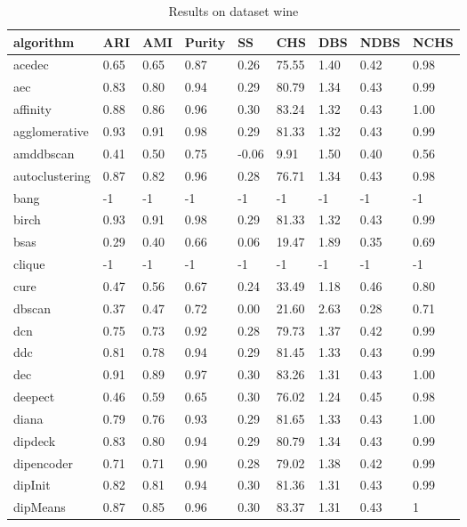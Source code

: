 \begin{table}[H]
\centering
\caption{Results on dataset wine}
\label{tab:params:wine}
\begin{tabular}{|l|l|l|l|l|l|l|l|l|}
\hline
algorithm & ARI & AMI & Purity & SS & CHS & DBS & NDBS & NCHS \\
\hline
acedec & 0.65 & 0.65 & 0.87 & 0.26 & 75.55 & 1.40 & 0.42 & 0.98 \\
\hline
aec & 0.83 & 0.80 & 0.94 & 0.29 & 80.79 & 1.34 & 0.43 & 0.99 \\
\hline
affinity & 0.88 & 0.86 & 0.96 & 0.30 & 83.24 & 1.32 & 0.43 & 1.00 \\
\hline
agglomerative & 0.93 & 0.91 & 0.98 & 0.29 & 81.33 & 1.32 & 0.43 & 0.99 \\
\hline
amddbscan & 0.41 & 0.50 & 0.75 & -0.06 & 9.91 & 1.50 & 0.40 & 0.56 \\
\hline
autoclustering & 0.87 & 0.82 & 0.96 & 0.28 & 76.71 & 1.34 & 0.43 & 0.98 \\
\hline
bang & -1 & -1 & -1 & -1 & -1 & -1 & -1 & -1 \\
\hline
birch & 0.93 & 0.91 & 0.98 & 0.29 & 81.33 & 1.32 & 0.43 & 0.99 \\
\hline
bsas & 0.29 & 0.40 & 0.66 & 0.06 & 19.47 & 1.89 & 0.35 & 0.69 \\
\hline
clique & -1 & -1 & -1 & -1 & -1 & -1 & -1 & -1 \\
\hline
cure & 0.47 & 0.56 & 0.67 & 0.24 & 33.49 & 1.18 & 0.46 & 0.80 \\
\hline
dbscan & 0.37 & 0.47 & 0.72 & 0.00 & 21.60 & 2.63 & 0.28 & 0.71 \\
\hline
dcn & 0.75 & 0.73 & 0.92 & 0.28 & 79.73 & 1.37 & 0.42 & 0.99 \\
\hline
ddc & 0.81 & 0.78 & 0.94 & 0.29 & 81.45 & 1.33 & 0.43 & 0.99 \\
\hline
dec & 0.91 & 0.89 & 0.97 & 0.30 & 83.26 & 1.31 & 0.43 & 1.00 \\
\hline
deepect & 0.46 & 0.59 & 0.65 & 0.30 & 76.02 & 1.24 & 0.45 & 0.98 \\
\hline
diana & 0.79 & 0.76 & 0.93 & 0.29 & 81.65 & 1.33 & 0.43 & 1.00 \\
\hline
dipdeck & 0.83 & 0.80 & 0.94 & 0.29 & 80.79 & 1.34 & 0.43 & 0.99 \\
\hline
dipencoder & 0.71 & 0.71 & 0.90 & 0.28 & 79.02 & 1.38 & 0.42 & 0.99 \\
\hline
dipInit & 0.82 & 0.81 & 0.94 & 0.30 & 81.36 & 1.31 & 0.43 & 0.99 \\
\hline
dipMeans & 0.87 & 0.85 & 0.96 & 0.30 & 83.37 & 1.31 & 0.43 & 1 \\

\end{tabular}
\end{table}
